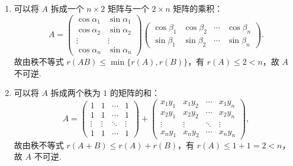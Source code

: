 \documentclass[12pt,fontset=fandol]{ctexart}
\begin{document}
\begin{solve}
\begin{enumerate}
                \item 可以将 $A$ 拆成一个 $n \times 2$ 矩阵与一个 $2 \times n$ 矩阵的乘积：
                    \[
                        A = \begin{pmatrix}
                            \cos \alpha_1 & \sin \alpha_1 \\
                            \cos \alpha_2 & \sin \alpha_2 \\
                            \vdots        & \vdots        \\
                            \cos \alpha_n & \sin \alpha_n
                        \end{pmatrix} \begin{pmatrix}
                            \cos \beta_1 & \cos \beta_2 & \cdots & \cos \beta_n \\
                            \sin \beta_1 & \sin \beta_2 & \cdots & \sin \beta_n
                        \end{pmatrix}.
                    \]
                    故由秩不等式 $r(AB) \leqslant \min\{r(A), r(B)\}$，有 $r(A) \leqslant 2 < n$，故 $A$ 不可逆.

                \item 可以将 $A$ 拆成两个秩为 $1$ 的矩阵的和：
                    \[
                        A = \begin{pmatrix}
                            1      & 1      & \cdots & 1      \\
                            1      & 1      & \cdots & 1      \\
                            \vdots & \vdots & \ddots & \vdots \\
                            1      & 1      & \cdots & 1
                        \end{pmatrix} + \begin{pmatrix}
                            x_1 y_1 & x_1 y_2 & \cdots & x_1 y_n \\
                            x_2 y_1 & x_2 y_2 & \cdots & x_2 y_n \\
                            \vdots  & \vdots  & \ddots & \vdots  \\
                            x_n y_1 & x_n y_2 & \cdots & x_n y_n
                        \end{pmatrix},
                    \]
                    故由秩不等式 $r(A+B) \leqslant r(A)+r(B)$，有 $r(A) \leqslant 1 + 1 = 2 < n$，故 $A$ 不可逆.
            \end{enumerate}
\end{solve}
\end{document}
